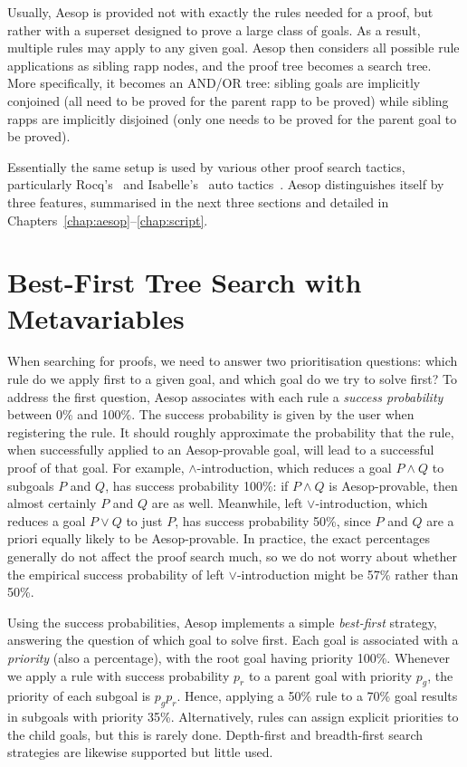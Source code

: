 Usually, Aesop is provided not with exactly the rules needed for a proof, but rather with a superset designed to prove a large class of goals.
As a result, multiple rules may apply to any given goal.
Aesop then considers all possible rule applications as sibling rapp nodes, and the proof tree becomes a search tree.
More specifically, it becomes an AND/OR tree: sibling goals are implicitly conjoined (all need to be proved for the parent rapp to be proved) while sibling rapps are implicitly disjoined (only one needs to be proved for the parent goal to be proved).

Essentially the same setup is used by various other proof search tactics, particularly Rocq's~\cite{Rocq} and Isabelle's~\cite{Isabelle} auto tactics~\cite{IsabelleAuto}.
Aesop distinguishes itself by three features, summarised in the next three sections and detailed in Chapters~\ref{chap:aesop}--\ref{chap:script}.

\section{Best-First Tree Search with Metavariables}

When searching for proofs, we need to answer two prioritisation questions: which rule do we apply first to a given goal, and which goal do we try to solve first?
To address the first question, Aesop associates with each rule a \emph{success probability} between 0\% and 100\%.
The success probability is given by the user when registering the rule.
It should roughly approximate the probability that the rule, when successfully applied to an Aesop-provable goal, will lead to a successful proof of that goal.
For example, $∧$-introduction, which reduces a goal $P ∧ Q$ to subgoals $P$ and $Q$, has success probability 100\%: if $P ∧ Q$ is Aesop-provable, then almost certainly $P$ and $Q$ are as well.
Meanwhile, left $∨$-introduction, which reduces a goal $P ∨ Q$ to just $P$, has success probability 50\%, since $P$ and $Q$ are a priori equally likely to be Aesop-provable.
In practice, the exact percentages generally do not affect the proof search much, so we do not worry about whether the empirical success probability of left $∨$-introduction might be 57\% rather than 50\%.

Using the success probabilities, Aesop implements a simple \emph{best-first} strategy, answering the question of which goal to solve first.
Each goal is associated with a \emph{priority} (also a percentage), with the root goal having priority 100\%.
Whenever we apply a rule with success probability $p_r$ to a parent goal with priority $p_g$, the priority of each subgoal is $p_g p_r$.
Hence, applying a 50\% rule to a 70\% goal results in subgoals with priority 35\%.
Alternatively, rules can assign explicit priorities to the child goals, but this is rarely done.
Depth-first and breadth-first search strategies are likewise supported but little used.

